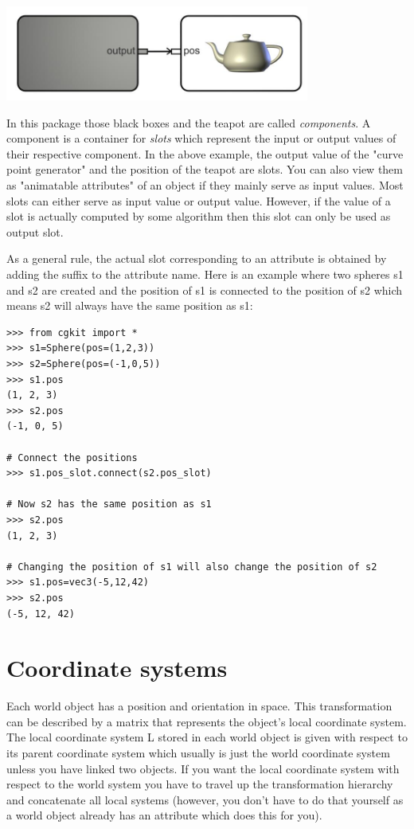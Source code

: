 \begin{center}
\includegraphics[width=10cm]{pics/slotexample}
\end{center}

In this package those black boxes and the teapot are called {\em
components}. A component is a container for {\em slots} which
represent the input or output values of their respective component. In
the above example, the output value of the "curve point generator" and
the position of the teapot are slots. You can also view them as
"animatable attributes" of an object if they mainly serve as input
values. Most slots can either serve as input value or output
value. However, if the value of a slot is actually computed by some
algorithm then this slot can only be used as output slot.

As a general rule, the actual slot corresponding to an attribute is
obtained by adding the suffix  to the attribute name.
Here is an example where two spheres s1 and s2 are created and
the position of s1 is connected to the position of s2 which means
s2 will always have the same position as s1:

\begin{verbatim}
>>> from cgkit import *
>>> s1=Sphere(pos=(1,2,3))
>>> s2=Sphere(pos=(-1,0,5))
>>> s1.pos
(1, 2, 3)
>>> s2.pos
(-1, 0, 5)

# Connect the positions 
>>> s1.pos_slot.connect(s2.pos_slot)

# Now s2 has the same position as s1
>>> s2.pos
(1, 2, 3)

# Changing the position of s1 will also change the position of s2
>>> s1.pos=vec3(-5,12,42)
>>> s2.pos
(-5, 12, 42)
\end{verbatim}

\section{Coordinate systems}

Each world object has a position and orientation in space. This
transformation can be described by a matrix that represents the
object's local coordinate system. The local coordinate system L stored
in each world object is given with respect to its parent coordinate
system which usually is just the world coordinate system unless you
have linked two objects. If you want the local coordinate system with
respect to the world system you have to travel up the transformation
hierarchy and concatenate all local systems (however, you don't have to
do that yourself as a world object already has an attribute 
 which does this for you). 

